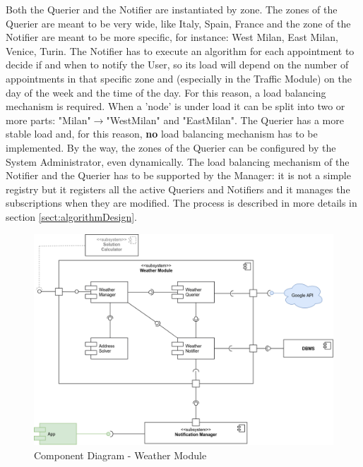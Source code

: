 		\medskip
		Both the Querier and the Notifier are instantiated by zone. The zones of the Querier are meant to be very wide, like Italy, Spain, France and the zone of the Notifier are meant to be more specific, for instance: West Milan, East Milan, Venice, Turin.\newline
		The Notifier has to execute an algorithm for each appointment to decide if and when to notify the User, so its load will depend on the number of appointments in that specific zone and (especially in the Traffic Module) on the day of the week and the time of the day. For this reason, a load balancing mechanism is required. When a 'node' is under load it can be split into two or more parts: "Milan"$\rightarrow$"WestMilan" and "EastMilan".\newline
		The Querier has a more stable load and, for this reason, \textbf{no} load balancing mechanism has to be implemented. By the way, the zones of the Querier can be configured by the System Administrator, even dynamically.\newline
		The load balancing mechanism of the Notifier and the  Querier has to be supported by the Manager: it is not a simple registry but it registers all the active Queriers and Notifiers and it manages the subscriptions when they are modified.\newline
		The process is described in more details in section \ref{sect:algorithmDesign}.

		\begin{figure}[H]
			\centerline{\includegraphics[width=0.9\paperwidth]{Images/CD_WeatherModule}}
			\caption{Component Diagram - Weather Module}
		\end{figure}

